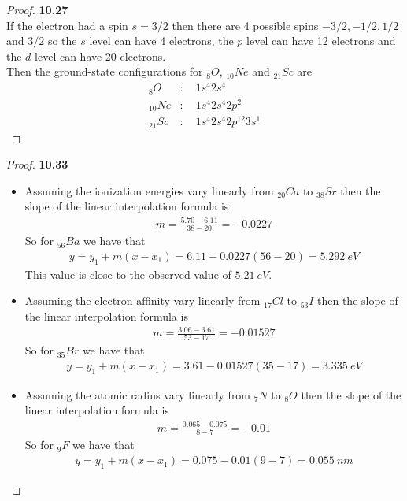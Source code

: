 \documentclass[11pt]{article}
\theoremstyle{definition}
\begin{document}
\cleardoublepage
\begin{proof}{\textbf{10.27}}\\
If the electron had a spin $s = 3/2$ then there are 4 possible spins
$-3/2, -1/2, 1/2$ and $3/2$ so the $s$ level can have 4 electrons, the $p$
level can have 12 electrons and the $d$ level can have 20 electrons.\\
Then the ground-state configurations for ${}_{8}O$, ${}_{10}Ne$ and ${}_{21}Sc$
are
\begin{align*}
    {}_{8}O&:\quad 1s^4 2s^4\\
    {}_{10}Ne&:\quad 1s^4 2s^4 2p^2\\
    {}_{21}Sc&:\quad 1s^4 2s^4 2p^{12} 3s^1
\end{align*}
\end{proof}

\cleardoublepage
\begin{proof}{\textbf{10.33}}\\
\begin{itemize}
\item [(a)] Assuming the ionization energies vary linearly from ${}_{20}Ca$
to ${}_{38}Sr$ then the slope of the linear interpolation formula is
\begin{align*}
    m = \frac{5.70 -6.11}{38 - 20} = -0.0227
\end{align*}
So for ${}_{56}Ba$ we have that
\begin{align*}
    y = y_1 + m(x - x_1) = 6.11 - 0.0227(56 - 20) = 5.292~eV
\end{align*}
This value is close to the observed value of $5.21~eV$.
\item [(b)] Assuming the electron affinity vary linearly from ${}_{17}Cl$
to ${}_{53}I$ then the slope of the linear interpolation formula is
\begin{align*}
    m = \frac{3.06 - 3.61}{53 - 17} = -0.01527
\end{align*}
So for ${}_{35}Br$ we have that
\begin{align*}
    y = y_1 + m(x - x_1) = 3.61 - 0.01527(35 - 17) = 3.335~eV
\end{align*}
\item [(c)] Assuming the atomic radius vary linearly from ${}_{7}N$
to ${}_{8}O$ then the slope of the linear interpolation formula is
\begin{align*}
    m = \frac{0.065 - 0.075}{8 - 7} = -0.01
\end{align*}
So for ${}_{9}F$ we have that
\begin{align*}
    y = y_1 + m(x - x_1) = 0.075 - 0.01(9 - 7) = 0.055~nm
\end{align*}

\end{itemize}
\end{proof}
\end{document}
